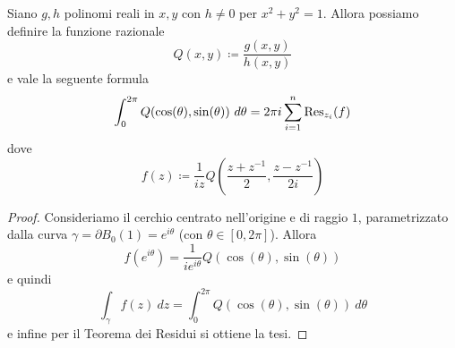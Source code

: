 \begin{proposition}
  \label{prop:caso-iv}
  Siano $g,h$ polinomi reali in $x,y$ con $h \neq 0$ per $x^2 + y^2 = 1$. Allora
  possiamo definire la funzione razionale 
  \begin{equation*}
    Q(x,y) \coloneqq \frac{g(x,y)}{h(x,y)} 
  \end{equation*}
  e vale la seguente formula
  \begin{equation*}
    \int_0^{2\pi} Q(\cos(\theta), \sin(\theta)) \ d\theta = 2\pi
    i \sum_{i=1}^n \operatorname{Res}_{z_i} (f)
  \end{equation*}
  dove 
  \begin{equation*}
    f(z) \coloneqq \frac{1}{iz} Q\left( \frac{z+z^{-1}}{2},
    \frac{z-z^{-1}}{2i} \right)
  \end{equation*}
\end{proposition}
\begin{proof}
  Consideriamo il cerchio centrato nell'origine e di raggio $1$, parametrizzato
  dalla curva $\gamma = \partial B_0(1) = e^{i\theta}$ (con $\theta \in \left[
  0,2\pi \right]$). Allora
  \begin{equation*} 
    f(e^{i\theta}) = \frac{1}{ie^{i\theta}}
    Q\left(\cos(\theta),\sin(\theta)\right)
  \end{equation*}
  e quindi 
  \begin{equation*}
    \int_{\gamma} f(z) \ dz = \int_{0}^{2\pi} Q(\cos(\theta), \sin(\theta))\
    d\theta
  \end{equation*}
  e infine per il Teorema dei Residui si ottiene la tesi.
\end{proof}

